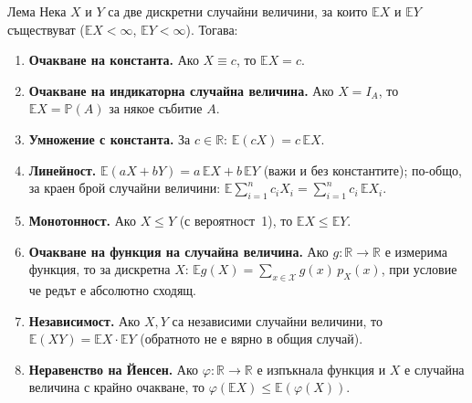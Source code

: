 \begin{thmbox}[]{Лема}
Нека $X$ и $Y$ са две дискретни случайни величини, за които
$\mathbb E X$ и $\mathbb E Y$ съществуват ($\mathbb EX<\infty$,
$\mathbb EY<\infty$). Тогава:
\begin{enumerate}[label=\arabic*)]
  \item \textbf{Очакване на константа.} Ако $X\equiv c$, то $\mathbb E X = c$.
  \item \textbf{Очакване на индикаторна случайна величина.} Ако $X=I_A$, то $\mathbb EX = \mathbb P(A)$ за някое събитие $A$.
  \item \textbf{Умножение с константа.} За $c\in\mathbb R$: $\mathbb E(cX) = c\,\mathbb EX$.
  \item \textbf{Линейност.} $\mathbb E(aX+bY) = a\,\mathbb EX + b\,\mathbb EY$ (важи и без константите); по-общо, за краен брой случайни величини: $\mathbb E\sum_{i=1}^n c_iX_i = \sum_{i=1}^n c_i\,\mathbb EX_i$.
  \item \textbf{Монотонност.} Ако $X\le Y$ (с вероятност~1), то $\mathbb EX\le\mathbb EY$.
  \item \textbf{Очакване на функция на случайна величина.} Ако $g:\mathbb R\to\mathbb R$ е измерима функция, то за дискретна $X$: $\mathbb Eg(X) = \sum_{x\in\mathcal X} g(x)\,p_X(x)$, при условие че редът е абсолютно сходящ.
  \item \textbf{Независимост.} Ако $X,Y$ са независими случайни величини, то $\mathbb E(XY)=\mathbb EX\cdot\mathbb EY$ (обратното не е вярно в общия случай).
  \item \textbf{Неравенство на Йенсен.} Ако $\varphi:\mathbb R\to\mathbb R$ е изпъкнала функция и $X$ е случайна величина с крайно очакване, то $\varphi(\mathbb EX)\le\mathbb E(\varphi(X))$.
\end{enumerate}
\end{thmbox}

